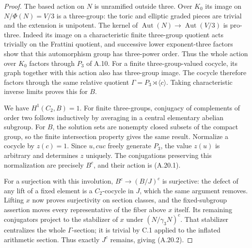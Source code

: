 \begin{proof}
The based action on $N$ is unramified outside three. Over $K_0$
its image on $N/\Phi(N)=V/3$ is a three-group: the toric and
elliptic graded pieces are trivial and the extension is unipotent.
The kernel of $\operatorname{Aut}(N)\to\operatorname{Aut}(V/3)$
is pro-three. Indeed its image on a characteristic finite
three-group quotient acts trivially on the Frattini quotient,
and successive lower exponent-three factors show that this
automorphism group has three-power order. Thus the whole action
over $K_0$ factors through $P_3$ of A.10. For a finite
three-group-valued cocycle, its graph together with this action
also has three-group image. The cocycle therefore factors through
the same relative quotient $\Gamma=P_3\rtimes\langle c\rangle$.
Taking characteristic inverse limits proves this for $B$.

We have $H^1(C_2,B)=1$. For finite three-groups, conjugacy of
complements of order two follows inductively by averaging in a
central elementary abelian subgroup. For $B$, the solution sets
are nonempty closed subsets of the compact group, so the finite
intersection property gives the same result. Normalize a
cocycle by $z(c)=1$. Since $u,cuc$ freely generate $P_3$, the
value $z(u)$ is arbitrary and determines $z$ uniquely.
The conjugations preserving this normalization are precisely
$B^c$, and their action is (A.20.1).

For a surjection with this involution, $B^c\to(B/J)^c$ is
surjective: the defect of any lift of a fixed element is a
$C_2$-cocycle in $J$, which the same argument removes.
Lifting $x$ now proves surjectivity on section classes, and
the fixed-subgroup assertion moves every representative of
the fiber above $x$ itself. Its remaining conjugators project
to the stabilizer of $x$ under $(N/\gamma_3N)^c$.
That stabilizer centralizes the whole $\Gamma$-section; it is
trivial by C.1 applied to the inflated arithmetic section.
Thus exactly $J^c$ remains, giving (A.20.2).
\end{proof}

